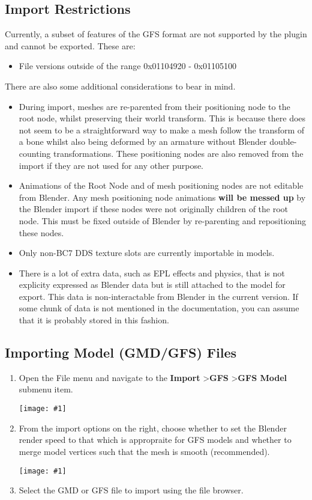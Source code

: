 \documentclass{article}
\newenvironment{guide}[1]
{
	\begin{center}
		\begin{tcolorbox}[%
			colback=black!20, 
			boxrule=0pt, 
			title=Step-by-step: #1,
			enhanced,
			breakable,
			overlay unbroken={%
                \draw[line width=1pt, black, rounded corners]
        	    (frame.north west) rectangle (frame.south east);
			},
    		overlay first={%
        		 \draw[line width=1pt, black, rounded corners]
        	    (frame.south west) -- (frame.north west) -- (frame.north east) -- (frame.south east);
                \draw[line width=1pt, black]
                (frame.south west) -- (frame.south east);
            },
    		overlay middle={%
                \draw[line width=1pt, black]
        	    (frame.north west) rectangle (frame.south east);
        	},
    		overlay last={%
                \draw[line width=1pt, black, rounded corners]
        	    (frame.north west) -- (frame.south west) -- (frame.south east) -- (frame.north east);
                \draw[line width=1pt, black]
                (frame.north west) -- (frame.north east);
           	}
        ]{}
    	\begin{enumerate}
}
{
    		\end{enumerate}
    	\end{tcolorbox}
	\end{center}  	 
}
\newcommand{\guideimage}[1]
{
	\begin{center}
		\texttt{[image: \#1]}
	\end{center}
}
\begin{document}
\subsection{Import Restrictions}
Currently, a subset of features of the GFS format are not supported by the plugin and cannot be exported. These are:
\begin{itemize}
\item File versions outside of the range 0x01104920 - 0x01105100
\end{itemize}
\noindent
There are also some additional considerations to bear in mind.
\begin{itemize}
\item During import, meshes are re-parented from their positioning node to the root node, whilst preserving their world transform. This is because there does not seem to be a straightforward way to make a mesh follow the transform of a bone whilst also being deformed by an armature without Blender double-counting transformations. These positioning nodes are also removed from the import if they are not used for any other purpose.
\item Animations of the Root Node and of mesh positioning nodes are not editable from Blender. Any mesh positioning node animations \textbf{will be messed up} by the Blender import if these nodes were not originally children of the root node. This must be fixed outside of Blender by re-parenting and repositioning these nodes.
\item Only non-BC7 DDS texture slots are currently importable in models.
\item There is a lot of extra data, such as EPL effects and physics, that is not explicity expressed as Blender data but is still attached to the model for export. This data is non-interactable from Blender in the current version. If some chunk of data is not mentioned in the documentation, you can assume that it is probably stored in this fashion.
\end{itemize}

\clearpage 

\subsection{Importing Model (GMD/GFS) Files}
\begin{guide}{Accessing the Model Import Menu}
\item Open the File menu and navigate to the \textbf{Import} \textgreater\space \textbf{GFS} \textgreater\space \textbf{GFS Model} submenu item.
\guideimage{images/import/import_gmd.png}
\item From the import options on the right, choose whether to set the Blender render speed to that which is appropraite for GFS models and whether to merge model vertices such that the mesh is smooth (recommended).
\guideimage{images/import/import_gmd_properties.png}
\item Select the GMD or GFS file to import using the file browser.
\end{guide}
\end{document}
